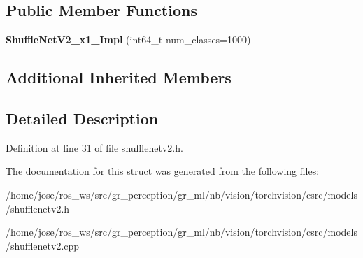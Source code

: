 \subsection*{Public Member Functions}
\begin{DoxyCompactItemize}
\item 
\mbox{\label{structvision_1_1models_1_1ShuffleNetV2__x1__5Impl_af5633ff07921bd36a7e416a4887ba0d8}} 
{\bfseries Shuffle\+Net\+V2\+\_\+x1\+\_\+Impl} (int64\+\_\+t num\+\_\+classes=1000)
\end{DoxyCompactItemize}
\subsection*{Additional Inherited Members}


\subsection{Detailed Description}


Definition at line 31 of file shufflenetv2.\+h.



The documentation for this struct was generated from the following files\+:\begin{DoxyCompactItemize}
\item 
/home/jose/ros\+\_\+ws/src/gr\+\_\+perception/gr\+\_\+ml/nb/vision/torchvision/csrc/models/shufflenetv2.\+h\item 
/home/jose/ros\+\_\+ws/src/gr\+\_\+perception/gr\+\_\+ml/nb/vision/torchvision/csrc/models/shufflenetv2.\+cpp\end{DoxyCompactItemize}
